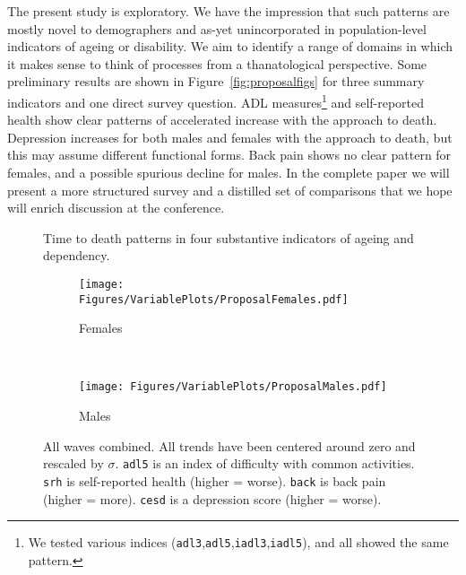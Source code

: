 \documentclass{article}
\begin{document}
The present study is exploratory. We have the impression
that such patterns are mostly novel to demographers and as-yet unincorporated in
population-level indicators of ageing or disability. We aim to identify a
range of domains in which it makes sense to think of processes from a
thanatological perspective. Some preliminary results are shown in
Figure~\ref{fig:proposalfigs} for three summary indicators and one direct survey
question. ADL measures\footnote{We tested various indices
(\texttt{adl3},\texttt{adl5},\texttt{iadl3},\texttt{iadl5}), and all showed the
same pattern.} and self-reported health show clear patterns of
accelerated increase with the approach to death. Depression increases for both
males and females with the approach to death, but this may assume different
functional forms. Back pain shows no clear pattern for females, and a
possible spurious decline for males. In the complete paper we will present a
more structured survey and a distilled set of comparisons that we hope will
enrich discussion at the conference. 

\begin{figure}
\centering
\caption{Time to death patterns in four substantive indicators of ageing and
dependency.}
\label{fig:proposalfigs}
\begin{subfigure}[b]{.47\linewidth}
\centering
	\caption{Females}
	\label{fig:females}
	\texttt{[image: Figures/VariablePlots/ProposalFemales.pdf]}	
\end{subfigure}
~
\begin{subfigure}[b]{.47\linewidth}
\centering
    \caption{Males}
	\label{fig:ales}
    \texttt{[image: Figures/VariablePlots/ProposalMales.pdf]}
\end{subfigure}
\caption{All waves combined. All trends have been centered around zero and
rescaled by $\sigma$. \texttt{adl5} is an index of difficulty with common
activities. \texttt{srh} is self-reported health (higher = worse).
\texttt{back} is back pain (higher = more). \texttt{cesd} is a depression score
(higher = worse).}
\end{figure}




   
  
\end{document}
